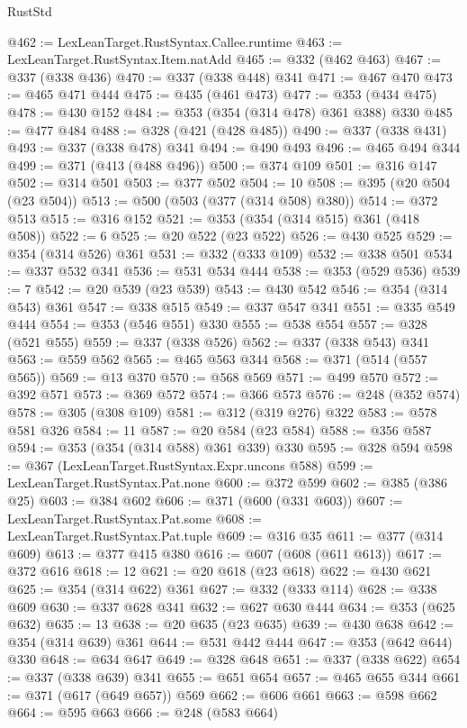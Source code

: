 \begin{lexlean}{RustStd}
\begin{coremodule}
@462 := LexLeanTarget.RustSyntax.Callee.runtime
@463 := LexLeanTarget.RustSyntax.Item.natAdd
@465 := @332 (@462 @463)
@467 := @337 (@338 @436)
@470 := @337 (@338 @448) @341
@471 := @467 @470
@473 := @465 @471 @444
@475 := @435 (@461 @473)
@477 := @353 (@434 @475)
@478 := @430 @152
@484 := @353 (@354 (@314 @478) @361 @388) @330
@485 := @477 @484
@488 := @328 (@421 (@428 @485))
@490 := @337 (@338 @431)
@493 := @337 (@338 @478) @341
@494 := @490 @493
@496 := @465 @494 @344
@499 := @371 (@413 (@488 @496))
@500 := @374 @109
@501 := @316 @147
@502 := @314 @501
@503 := @377 @502
@504 := 10
@508 := @395 (@20 @504 (@23 @504))
@513 := @500 (@503 (@377 (@314 @508) @380))
@514 := @372 @513
@515 := @316 @152
@521 := @353 (@354 (@314 @515) @361 (@418 @508))
@522 := 6
@525 := @20 @522 (@23 @522)
@526 := @430 @525
@529 := @354 (@314 @526) @361
@531 := @332 (@333 @109)
@532 := @338 @501
@534 := @337 @532 @341
@536 := @531 @534 @444
@538 := @353 (@529 @536)
@539 := 7
@542 := @20 @539 (@23 @539)
@543 := @430 @542
@546 := @354 (@314 @543) @361
@547 := @338 @515
@549 := @337 @547 @341
@551 := @335 @549 @444
@554 := @353 (@546 @551) @330
@555 := @538 @554
@557 := @328 (@521 @555)
@559 := @337 (@338 @526)
@562 := @337 (@338 @543) @341
@563 := @559 @562
@565 := @465 @563 @344
@568 := @371 (@514 (@557 @565))
@569 := @13 @370
@570 := @568 @569
@571 := @499 @570
@572 := @392 @571
@573 := @369 @572
@574 := @366 @573
@576 := @248 (@352 @574)
@578 := @305 (@308 @109)
@581 := @312 (@319 @276) @322
@583 := @578 @581 @326
@584 := 11
@587 := @20 @584 (@23 @584)
@588 := @356 @587
@594 := @353 (@354 (@314 @588) @361 @339) @330
@595 := @328 @594
@598 := @367 (LexLeanTarget.RustSyntax.Expr.uncons @588)
@599 := LexLeanTarget.RustSyntax.Pat.none
@600 := @372 @599
@602 := @385 (@386 @25)
@603 := @384 @602
@606 := @371 (@600 (@331 @603))
@607 := LexLeanTarget.RustSyntax.Pat.some
@608 := LexLeanTarget.RustSyntax.Pat.tuple
@609 := @316 @35
@611 := @377 (@314 @609)
@613 := @377 @415 @380
@616 := @607 (@608 (@611 @613))
@617 := @372 @616
@618 := 12
@621 := @20 @618 (@23 @618)
@622 := @430 @621
@625 := @354 (@314 @622) @361
@627 := @332 (@333 @114)
@628 := @338 @609
@630 := @337 @628 @341
@632 := @627 @630 @444
@634 := @353 (@625 @632)
@635 := 13
@638 := @20 @635 (@23 @635)
@639 := @430 @638
@642 := @354 (@314 @639) @361
@644 := @531 @442 @444
@647 := @353 (@642 @644) @330
@648 := @634 @647
@649 := @328 @648
@651 := @337 (@338 @622)
@654 := @337 (@338 @639) @341
@655 := @651 @654
@657 := @465 @655 @344
@661 := @371 (@617 (@649 @657)) @569
@662 := @606 @661
@663 := @598 @662
@664 := @595 @663
@666 := @248 (@583 @664)

\end{coremodule}
\end{lexlean}
